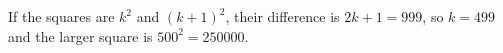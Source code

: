 If the squares are $k^2$ and $(k+1)^2$, their difference is $2k+1=999$, so $k=499$ and the larger square is $500^2=\boxed{250000}$.
